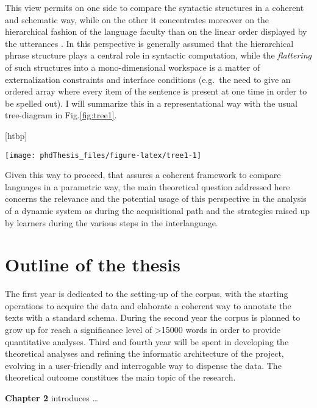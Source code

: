\documentclass[a4paper,twoside,12pt,chapterprefix=false,bibliography=totocnumbered,listof=flat]{scrbook}
\makeatletter
\def\fps@figure{htbp}
\renewenvironment{figure}[1][\fps@figure]{
  \edef\@tempa{\noexpand\@float{figure}[#1]} 
  \@tempa
  \sffamily
}{
  \end@float
}
\theoremstyle{definition}
\theoremstyle{definition}
\theoremstyle{definition}
\theoremstyle{remark}
\makeatother
\begin{document}
This view permits on one side to compare the syntactic structures in a
coherent and schematic way, while on the other it concentrates moreover
on the hierarchical fashion of the language faculty than on the linear
order displayed by the utterances \citep{kayne1994, moro2000}. In this
perspective is generally assumed that the hierarchical phrase structure
plays a central role in syntactic computation, while the
\emph{flattering} of such structures into a mono-dimensional workspace
is a matter of externalization constraints and interface conditions
(e.g.~the need to give an ordered array where every item of the sentence
is present at one time in order to be spelled out). I will summarize
this in a representational way with the usual tree-diagram in
Fig.\ref{fig:tree1}.

\begin{figure}

{\centering \texttt{[image: phdThesis\_files/figure-latex/tree1-1]} 

}

\caption{Structural representation of a simple sentence}\label{fig:tree1}
\end{figure}

Given this way to proceed, that assures a coherent framework to compare
languages in a parametric way, the main theoretical question addressed
here concerns the relevance and the potential usage of this perspective
in the analysis of a dynamic system as during the acquisitional path and
the strategies raised up by learners during the various steps in the
interlanguage.

\section{Outline of the thesis}\label{outline-of-the-thesis}

The first year is dedicated to the setting-up of the corpus, with the
starting operations to acquire the data and elaborate a coherent way to
annotate the texts with a standard schema. During the second year the
corpus is planned to grow up for reach a significance level of
\textgreater{}15000 words in order to provide quantitative analyses.
Third and fourth year will be spent in developing the theoretical
analyses and refining the informatic architecture of the project,
evolving in a user-friendly and interrogable way to dispense the data.
The theoretical outcome constitues the main topic of the research.

\textbf{Chapter 2} introduces \ldots{}
\end{document}
